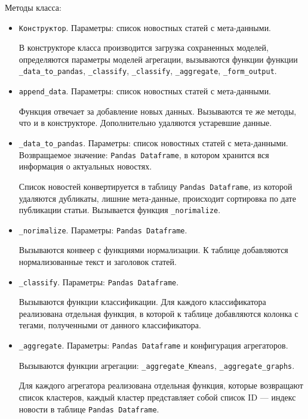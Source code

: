 Методы класса:
\begin{itemize}
    \item \verb|Конструктор|. Параметры: список новостных статей с мета-данными.

    В конструкторе класса производится загрузка сохраненных моделей, определяются параметры моделей агрегации, вызываются функции 
    функции \verb|_data_to_pandas|, \verb|_classify|, \verb|_classify|, \verb|_aggregate|, \verb|_form_output|.

    \item \verb|append_data|. Параметры: список новостных статей с мета-данными.

    Функция отвечает за добавление новых данных. Вызываются те же методы, что и
    в конструкторе. Дополнительно удаляются устаревшие данные.

    \item \verb|_data_to_pandas|. Параметры: список новостных статей с мета-данными. Возвращаемое значение: \verb|Pandas Dataframe|, в котором хранится
    вся информация о актуальных новостях.

    Список новостей конвертируется в таблицу \verb|Pandas Dataframe|, из которой
    удаляются дубликаты, лишние мета-данные, происходит сортировка по дате 
    публикации статьи. Вызывается функция \verb|_norimalize|.

    \item \verb|_norimalize|. Параметры: \verb|Pandas Dataframe|.

    Вызываются конвеер с функциями нормализации. К таблице
    добавляются нормализованные текст и заголовок статей.

    \item \verb|_classify|. Параметры: \verb|Pandas Dataframe|.

    Вызываются функции классификации. Для каждого классификатора реализована отдельная функция, в которой к таблице добавляются колонка с тегами,
    полученными от данного классификатора.

    \item \verb|_aggregate|. Параметры: \verb|Pandas Dataframe| и 
    конфигурация агрегаторов.

    Вызываются функции агрегации: \verb|_aggregate_Kmeans|,
    \verb|_aggregate_graphs|.

    Для каждого агрегатора реализована отдельная функция, которые возвращают список кластеров, каждый кластер представляет
    собой список ID --- индекс новости в таблице \verb|Pandas Dataframe|.


\end{itemize}
